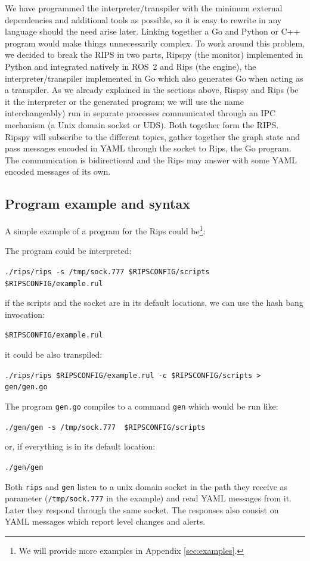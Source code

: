 \documentclass[a4paper]{article}
\begin{document}
We have programmed the interpreter/transpiler with the minimum external
dependencies and additional tools as possible, so it is easy to rewrite
in any language should the need arise later.  Linking together a Go
and Python or C++ program would make things unnecessarily complex. To
work around this problem, we decided to break the RIPS in two parts,
Ripspy (the monitor) implemented in Python and integrated natively in
ROS~2 and Rips (the engine), the interpreter/transpiler implemented in
Go which also generates Go when acting as a transpiler.  As we already
explained in the sections above, Rispsy and Rips
(be it the interpreter or the generated program; we will use the name
interchangeably) run in separate processes communicated through an IPC
mechanism (a Unix domain socket or UDS). Both together form the RIPS.
Ripspy will subscribe to the different topics, gather together the graph
state and pass messages encoded in YAML through the socket to Rips, the
Go program. The communication is bidirectional and the Rips may answer
with some YAML encoded messages of its own.


\subsection{Program example and syntax}
A simple example of a program for the Rips could be\footnote{We will provide
more examples in Appendix
\ref{sec:examples}.}:



The program could be interpreted:


\verb+./rips/rips -s /tmp/sock.777 $RIPSCONFIG/scripts $RIPSCONFIG/example.rul +

if the scripts and the socket are in its default locations, we can use the hash bang
invocation:

\verb+$RIPSCONFIG/example.rul+

it could be also transpiled:


\verb+./rips/rips $RIPSCONFIG/example.rul -c $RIPSCONFIG/scripts > gen/gen.go+


The program \texttt{gen.go} compiles to a command \texttt{gen} which would
be run like:


 \verb+./gen/gen -s /tmp/sock.777  $RIPSCONFIG/scripts+

or, if everything is in its default location:

 \verb+./gen/gen+


Both \texttt{rips} and \texttt{gen} listen to a unix domain socket in the
path they receive as parameter (\texttt{/tmp/sock.777} in the example)
and read YAML messages from it. Later they respond through the same
socket. The responses also consist on YAML messages which report level
changes and alerts.
\end{document}
